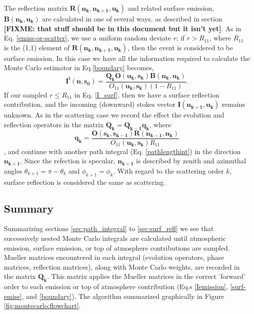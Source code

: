 The reflection matrix $\mathbf{R(n_k,n_{k+1},u_k)}$ and related surface emission, $\mathbf{B(n_k,u_k)}$ are calculated in one of several ways, as described in section {\bf[FIXME: that stuff should be in this document but it isn't yet]}.  As in Eq. \ref{emiss-or-scatter}, we use a uniform random deviate $r$; if
$r>R_{11}$, where $R_{11}$ is the (1,1) element of $\mathbf{R(n_k,n_{k+1},u_k)}$, then the event is considered to be surface emission.  In
this case we have all the information required to calculate the Monte
Carlo estimator in Eq.\ref{boundary} becomes, 
\begin{equation}
\mathbf{I^i(n,s_0)}=\frac{\mathbf{Q_k}\mathbf{O(u_k,s_k)B(n_k,u_k)}}{O_{11}(\mathbf{u_{k},s_k})(1-R_{11})}.
\label{surf-emiss}
\end{equation}
If our sampled $r \le R_{11}$ in Eq. \ref{I_surf}, then we have a surface reflection contribution, and the incoming (downward) stokes vector $\mathbf{I(n_{k+1},u_k)}$ remains unknown.  As in the scattering case we record the effect the evolution and reflection operators in the matrix $\mathbf{Q_k}=\mathbf{Q_{k-1}q_k}$, where
\begin{equation}
\mathbf{q_k}=\frac{\mathbf{O(s_k,s_{k-1})}\mathbf{R(n_{k-1},n_k)}}
  {O_{11}(\mathbf{u_{k},s_k})R_{11}}
\end{equation}
, and continue with another path integral (Eq. \ref{pathlengthint}) in the direction $\mathbf{n_{k+1}}$.
Since the refection is specular, $\mathbf{n_{k+1}}$ is described by zenith and azimuthal angles $\theta_{k+1}=\pi-\theta_k$ and $\phi_{k+1}=\phi_k$.  With regard to the scattering order $k$, surface reflection is considered the same as scattering.

\subsection{Summary}

Summarizing sections \ref{sec:path_integral} to \ref{sec:surf_refl} we see that successively nested Monte Carlo integrals are calculated until atmospheric emission, surface emission, or top of atmosphere contributions are sampled.  Mueller matrices encountered in each integral (evolution operators, phase matrices, reflection matrices), along with Monte Carlo weights, are recorded in the matrix $\mathbf{Q_k}$.  This matrix applies the Mueller matrices in the correct 'forward' order to each emission or top of atmosphere contribution (Eq.s \ref{Iemission}, \ref{surf-emiss}, and \ref{boundary}).  The algorithm summarized graphically in Figure \ref{fig:montecarlo:flowchart}. 


